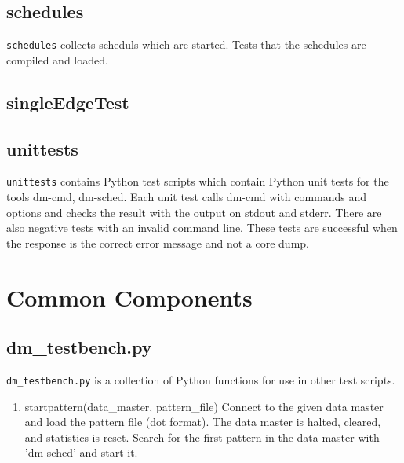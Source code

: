 \documentclass[12pt,a4paper]{report}
\begin{document}
\section{schedules}
\texttt{schedules} collects scheduls which are started. Tests that the schedules are compiled and loaded.
\section{singleEdgeTest}

\section{unittests}
\texttt{unittests} contains Python test scripts which contain Python unit tests for the tools dm-cmd, dm-sched. Each unit test calls dm-cmd 
with commands and options and checks the result with the output on stdout and stderr. There are also negative tests with an invalid command 
line. These tests are successful when the response is the correct error message and not a core dump.
\chapter{Common Components}
\section{dm\_testbench.py}
\texttt{dm\_testbench.py} is a collection of Python functions for use in other test scripts.
\begin{enumerate}
\item startpattern(data\_master, pattern\_file)
    Connect to the given data master and load the pattern file (dot format).
    The data master is halted, cleared, and statistics is reset.
    Search for the first pattern in the data master with 'dm-sched' and start it.
\end{enumerate}
\end{document}
